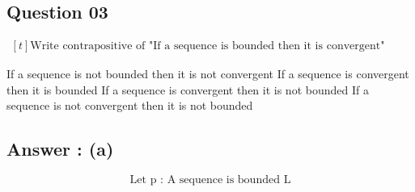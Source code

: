 \documentclass[17pt]{extarticle}
\begin{document}
\begin{fleqn}
\section{Question 03} 

$\begin{aligned}[t] 
\text {Write contrapositive of "If a sequence is bounded then it is convergent" } 
\end{aligned}$

\begin{tasks}
  \task If a sequence is not bounded then it is not convergent 
  \task If a sequence is convergent then it is bounded 
  \task If a sequence is convergent then it is not bounded
  \task If a sequence is not convergent then it is not bounded
\end{tasks}
\subsection*{Answer : (a)}
\begin{equation} \nonumber
\text {Let p : A sequence is bounded }
\text {L}
\end{equation}


\end{fleqn}
\end{document}

